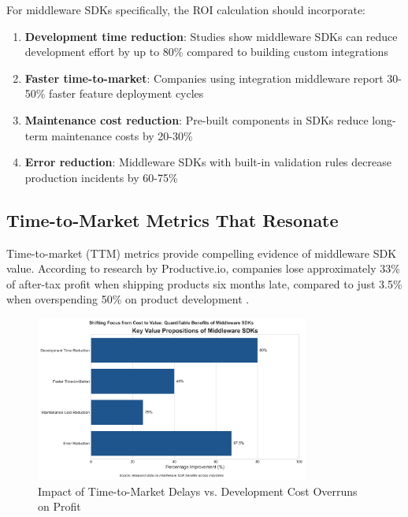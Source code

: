\documentclass[11pt,a4paper]{article}
\begin{document}
For middleware SDKs specifically, the ROI calculation should incorporate:

\begin{enumerate}
    \item \textbf{Development time reduction}: Studies show middleware SDKs can reduce development effort by up to 80\% compared to building custom integrations \citep{prismatic2024roi}
    \item \textbf{Faster time-to-market}: Companies using integration middleware report 30-50\% faster feature deployment cycles \citep{aws2022nnamu}
    \item \textbf{Maintenance cost reduction}: Pre-built components in SDKs reduce long-term maintenance costs by 20-30\% \citep{haveignition2024kpis}
    \item \textbf{Error reduction}: Middleware SDKs with built-in validation rules decrease production incidents by 60-75\% \citep{haveignition2024kpis}
\end{enumerate}

\subsection{Time-to-Market Metrics That Resonate}

Time-to-market (TTM) metrics provide compelling evidence of middleware SDK value. According to research by Productive.io, companies lose approximately 33\% of after-tax profit when shipping products six months late, compared to just 3.5\% when overspending 50\% on product development \citep{Jurcic2025}.

\begin{figure}[htbp]
    \centering
    \includegraphics[width=0.8\textwidth]{figures/visualization-20250510131736.png}
    \caption{Impact of Time-to-Market Delays vs. Development Cost Overruns on Profit}
    \label{fig:ttm-impact}
\end{figure}
\end{document}
